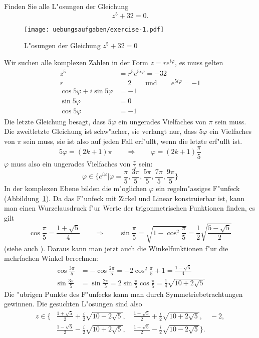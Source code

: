 Finden Sie alle L"osungen der Gleichung
\[
z^5+32=0.
\]

\begin{loesung}
\begin{figure}
\centering
\texttt{[image: uebungsaufgaben/exercise-1.pdf]}
\caption{L"osungen der Gleichung $z^5+32=0$
\label{skript:15006:loesungen}}
\end{figure}
Wir suchen alle komplexen Zahlen in der Form $z=re^{i\varphi}$, es muss gelten
\begin{align*}
z^5&=r^5e^{5i\varphi}=-32
\\
r&=2\qquad\text{und}\qquad e^{5i\varphi}=-1
\\
\cos 5\varphi+i\sin 5\varphi&=-1
\\
\sin 5\varphi&=0
\\
\cos 5\varphi&=-1
\end{align*}
Die letzte Gleichung besagt, dass $5\varphi$ ein ungerades Vielfaches von
$\pi$ sein muss. Die zweitletzte Gleichung ist schw"acher, sie verlangt
nur, dass $5\varphi$ ein Vielfaches von $\pi$ sein muss, sie ist also
auf jeden Fall erf"ullt, wenn die letzte erf"ullt ist.
\[
5\varphi=(2k+1)\pi
\qquad\Rightarrow\qquad
\varphi=(2k+1)\frac{\pi}5
\]
$\varphi$ muss also ein ungerades Vielfaches von $\frac{\pi}5$ sein:
\[
\varphi\in\biggl\{
e^{i\varphi}\bigg|
\varphi
=
\frac{\pi}{5},
\frac{3\pi}{5},
\frac{5\pi}{5},
\frac{7\pi}{5},
\frac{9\pi}{5}
\biggr\}
\]
In der komplexen Ebene bilden die m"oglichen $\varphi$ ein regelm"assiges
F"unfeck (Abbildung~\ref{skript:15006:loesungen}).
Da das F"unfeck mit Zirkel und Linear konstruierbar ist, kann man
einen Wurzelausdruck f"ur Werte der trigonmetrischen Funktionen 
finden, es gilt
\[
\cos\frac{\pi}{5}=\frac{1+\sqrt{5}}4
\qquad
\Rightarrow
\qquad
\sin\frac{\pi}5
=
\sqrt{1-\cos^2\frac{\pi}5}
=
\frac12\sqrt{\frac{5-\sqrt{5}}2}
\]
(siehe auch \cite{skript:pentagon}).
Daraus kann man jetzt auch die Winkelfunktionen f"ur die mehrfachen
Winkel berechnen:
\begin{align*}
\cos\frac{3\pi}5
&=
-\cos\frac{2\pi}5
=
-2\cos^2\frac{\pi}5+1
=
\frac{1-\sqrt{5}}4
\\
\sin\frac{3\pi}5
&=
\sin\frac{2\pi}5
=
2\sin\frac{\pi}5\cos\frac{\pi}5
=
\frac14\sqrt{10+2\sqrt{5}}
\end{align*}
Die "ubrigen Punkte des F"unfecks kann man durch Symmetriebetrachtungen
gewinnen.
Die gesuchten L"osungen sind also
\begin{align*}
z
\in
\biggl\{
&
\frac{1+\sqrt{5}}2+\frac{i}2\sqrt{10-2\sqrt{5}},\quad
\frac{1-\sqrt{5}}2 + \frac{i}2\sqrt{10+2\sqrt{5}},\quad
-2,
\\
&
\frac{1-\sqrt{5}}2 - \frac{i}2\sqrt{10+2\sqrt{5}},\quad
\frac{1+\sqrt{5}}2-\frac{i}2\sqrt{10-2\sqrt{5}}
\biggr\}.
\end{align*}
\end{loesung}

